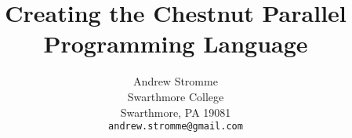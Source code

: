 \documentclass[11pt,twocolumn]{article}
\begin{document}
\title{Creating the Chestnut Parallel Programming Language}


\author{
  Andrew Stromme \\                 
  Swarthmore College \\
  Swarthmore, PA 19081 \\
  {\tt andrew.stromme@gmail.com}}

\date{}
\maketitle














\end{document}
